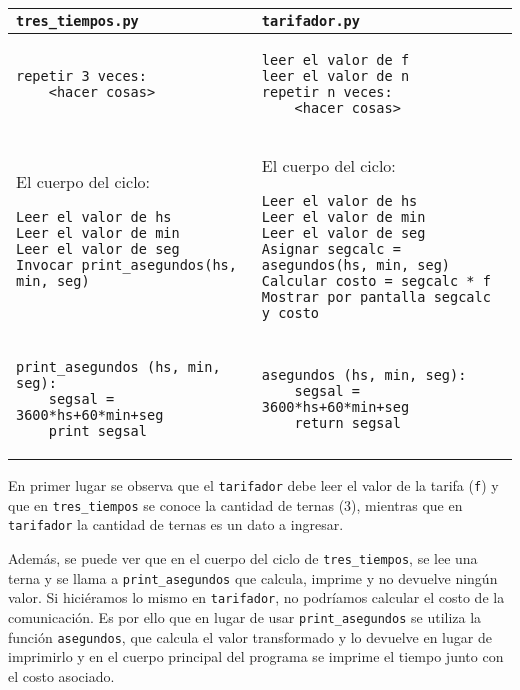 \begin{solucion}
\begin{enumerate}
\begin{tabular}[l]{|p{6.8cm}|p{7.5cm}|}
\hline {\lstinline!tres_tiempos.py!} & \lstinline!tarifador.py!\\
\hline
\begin{verbatim}
repetir 3 veces:
    <hacer cosas>
\end{verbatim}
&
\begin{verbatim}
leer el valor de f
leer el valor de n
repetir n veces:
    <hacer cosas>
\end{verbatim}
\\
\hline
El cuerpo del ciclo:
{\footnotesize
\begin{verbatim}
Leer el valor de hs
Leer el valor de min
Leer el valor de seg
Invocar print_asegundos(hs, min, seg)


\end{verbatim}
} &
El cuerpo del ciclo:
{\footnotesize
\begin{verbatim}
Leer el valor de hs
Leer el valor de min
Leer el valor de seg
Asignar segcalc = asegundos(hs, min, seg)
Calcular costo = segcalc * f
Mostrar por pantalla segcalc y costo
\end{verbatim}
} \\
\hline
{\footnotesize
\begin{verbatim}
print_asegundos (hs, min, seg):
	segsal = 3600*hs+60*min+seg
	print segsal
\end{verbatim}
} &
{\footnotesize
\begin{verbatim}
asegundos (hs, min, seg):
	segsal = 3600*hs+60*min+seg
	return segsal
\end{verbatim}
} \\
\hline
\end{tabular}


En primer lugar se observa que el \lstinline!tarifador! debe leer el valor de
la tarifa (\lstinline!f!) y que en \lstinline!tres_tiempos! se conoce la
cantidad de ternas (3), mientras que en \lstinline!tarifador! la cantidad
de ternas es un dato a ingresar.

Además, se puede ver que en el cuerpo del ciclo de
\lstinline!tres_tiempos!, se lee una terna y se llama a
\lstinline!print_asegundos! que calcula, imprime y no devuelve ningún
valor.  Si hiciéramos lo mismo en \lstinline!tarifador!, no podríamos
calcular el costo de la comunicación.  Es por ello que en lugar de usar
\lstinline!print_asegundos! se utiliza la función \lstinline!asegundos!,
que calcula el valor transformado y lo devuelve en lugar de imprimirlo y en
el cuerpo principal del programa se imprime el tiempo junto con el costo
asociado.


\end{enumerate}
\end{solucion}
